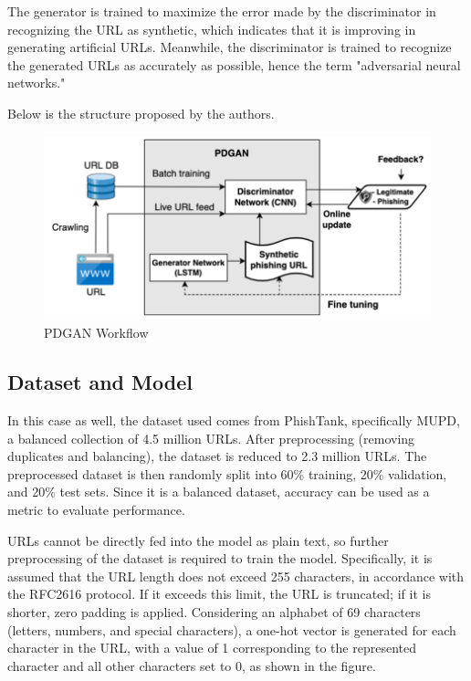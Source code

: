 The generator is trained to maximize the error made by the discriminator in recognizing the URL as synthetic, which indicates that it is improving in generating artificial URLs. Meanwhile, the discriminator is trained to recognize the generated URLs as accurately as possible, hence the term "adversarial neural networks."

Below is the structure proposed by the authors.

\begin{figure}[htp]
    \centering
    \includegraphics[width=0.8\linewidth]{images/PDGAN system.png}
    \caption{PDGAN Workflow}
    \label{fig:PDGAN Workflow}
\end{figure}

\subsection{Dataset and Model}
In this case as well, the dataset used comes from PhishTank, specifically MUPD, a balanced collection of 4.5 million URLs. After preprocessing (removing duplicates and balancing), the dataset is reduced to 2.3 million URLs. The preprocessed dataset is then randomly split into 60\% training, 20\% validation, and 20\% test sets. Since it is a balanced dataset, accuracy can be used as a metric to evaluate performance.

URLs cannot be directly fed into the model as plain text, so further preprocessing of the dataset is required to train the model. Specifically, it is assumed that the URL length does not exceed 255 characters, in accordance with the RFC2616 protocol. If it exceeds this limit, the URL is truncated; if it is shorter, zero padding is applied. Considering an alphabet of 69 characters (letters, numbers, and special characters), a one-hot vector is generated for each character in the URL, with a value of 1 corresponding to the represented character and all other characters set to 0, as shown in the figure.


